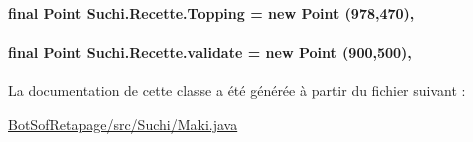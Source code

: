 \paragraph[{Topping}]{\setlength{\rightskip}{0pt plus 5cm}final Point Suchi.\+Recette.\+Topping = new Point (978,470)\hspace{0.3cm}{\ttfamily [protected]}, {\ttfamily [inherited]}}\label{classSuchi_1_1Recette_a4810b2254c050209fba27757066668b3}
\hypertarget{classSuchi_1_1Recette_aff16265c9b0b819091af71f64ef84be7}{}
\paragraph[{validate}]{\setlength{\rightskip}{0pt plus 5cm}final Point Suchi.\+Recette.\+validate = new Point (900,500)\hspace{0.3cm}{\ttfamily [protected]}, {\ttfamily [inherited]}}\label{classSuchi_1_1Recette_aff16265c9b0b819091af71f64ef84be7}


La documentation de cette classe a été générée à partir du fichier suivant \+:\begin{DoxyCompactItemize}
\item 
\hyperlink{BotSofRetapage_2src_2Suchi_2Maki_8java}{Bot\+Sof\+Retapage/src/\+Suchi/\+Maki.\+java}\end{DoxyCompactItemize}
